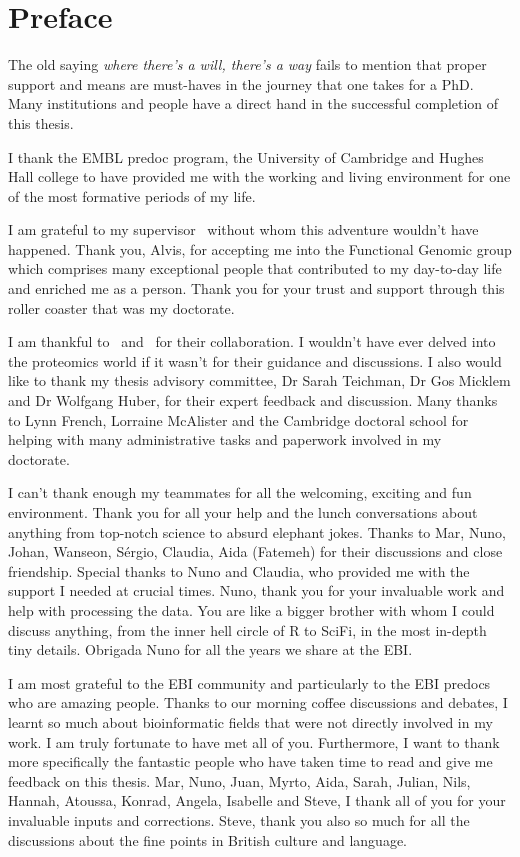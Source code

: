 \chapter*{Preface}
\label{ch:acknowledgements}
\vspace{-1cm}
The old saying \emph{where there's a will, there's a way} fails to mention that
proper support and means are must-haves in the journey that one takes for a PhD.
Many institutions and people have
a direct hand in the successful completion of this thesis.

I thank the EMBL predoc program, the University of Cambridge
and Hughes Hall college to have provided me
with the working and living environment
for one of the most formative periods of my life.

I am grateful to my supervisor \alvis\
without whom this adventure wouldn't have happened.
Thank you, Alvis, for accepting me into the Functional Genomic group
which comprises many exceptional people
that contributed to my day-to-day life and enriched me as a person.
Thank you for your trust and support
through this roller coaster that was my doctorate.

I am thankful to \jyoti\ and \james\ for their collaboration.
I wouldn't have ever delved into the proteomics world
if it wasn't for their guidance and discussions.
I also would like to thank my thesis advisory committee,
Dr Sarah Teichman, Dr Gos Micklem and Dr Wolfgang Huber,
for their expert feedback and discussion.
Many thanks to Lynn French, Lorraine McAlister and the Cambridge doctoral school
for helping with many administrative tasks and paperwork involved in my doctorate.\mybr\

I can't thank enough my teammates for all the welcoming,
exciting and fun environment.
Thank you for all your help and the lunch conversations about anything
from top-notch science to absurd elephant jokes.
Thanks to Mar, Nuno, Johan, Wanseon, Sérgio, Claudia, Aida (Fatemeh)
for their discussions and close friendship.
Special thanks to Nuno and Claudia,
who provided me with the support I needed at crucial times.
Nuno, thank you for your invaluable work and help with processing the data.
You are like a bigger brother with whom I could discuss anything,
from the inner hell circle of R to SciFi, in the most in-depth tiny details.
Obrigada Nuno for all the years we share at the EBI.\@

I am most grateful to the EBI community and
particularly to the EBI predocs who are amazing people.
Thanks to our morning coffee discussions and debates,
I learnt so much about bioinformatic fields that
were not directly involved in my work.
I am truly fortunate to have met all of you.
Furthermore, I want to thank more specifically the fantastic people
who have taken time to read and give me feedback on this thesis.
Mar, Nuno, Juan, Myrto, Aida, Sarah, Julian, Nils,
Hannah, Atoussa, Konrad, Angela,
Isabelle and Steve, I thank all of you for your invaluable inputs and corrections.
Steve, thank you also so much for all the discussions
about the fine points in British culture and language.

